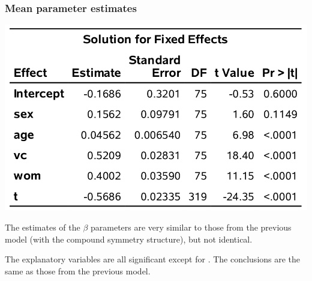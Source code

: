 \documentclass{beamer}
\begin{document}
\begin{frame}[fragile]
\frametitle{Mean parameter estimates}
\begin{center}
\includegraphics[width = 0.7\linewidth]{img/c5/slides6-e17}
\end{center}
\bi
\item The estimates of the $\beta$ parameters are very similar to those from the previous model (with the compound symmetry structure), but not identical. 
\item The explanatory variables are all significant except for . The conclusions are the same as those from the previous model.
\ei
\end{frame}
\end{document}
